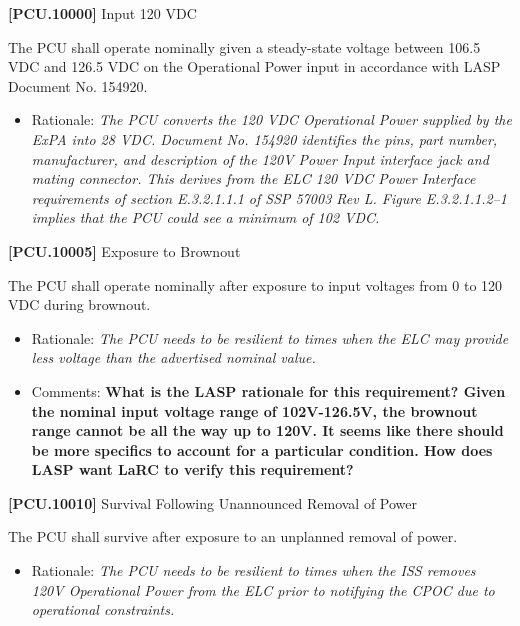 \documentclass[12pt,oneside,oldfontcommands]{memoir}
\begin{document}
\textbf{[PCU.10000]} Input 120 \gls{VDC}

The \gls{PCU} shall operate nominally given a steady-state voltage between 106.5 \gls{VDC} and 126.5 \gls{VDC} on the Operational Power input in accordance with \gls{LASP} Document No. 154920.

\begin{itemize}
\item{} Rationale: \emph{The PCU converts the 120 VDC Operational Power supplied by the ExPA into 28 VDC. Document No. 154920 identifies the pins, part number, manufacturer, and description of the 120V Power Input interface jack and mating connector. This derives from the ELC 120 VDC Power Interface requirements of section E.3.2.1.1.1 of SSP 57003 Rev L. Figure E.3.2.1.1.2--1 implies that the PCU could see a minimum of 102 VDC.}

\end{itemize}

\textbf{[PCU.10005]} Exposure to Brownout

The \gls{PCU} shall operate nominally after exposure to input voltages from 0 to 120 \gls{VDC} during brownout.

\begin{itemize}
\item{} Rationale: \emph{The PCU needs to be resilient to times when the ELC may provide less voltage than the advertised nominal value.}

\item{} Comments: \textbf{What is the LASP rationale for this requirement? Given the nominal input voltage range of 102V-126.5V, the brownout range cannot be all the way up to 120V. It seems like there should be more specifics to account for a particular condition. How does LASP want LaRC to verify this requirement?}

\end{itemize}

\textbf{[PCU.10010]} Survival Following Unannounced Removal of Power

The \gls{PCU} shall survive after exposure to an unplanned removal of power.

\begin{itemize}
\item{} Rationale: \emph{The PCU needs to be resilient to times when the ISS removes 120V Operational Power from the ELC prior to notifying the CPOC due to operational constraints.}

\end{itemize}
\end{document}
